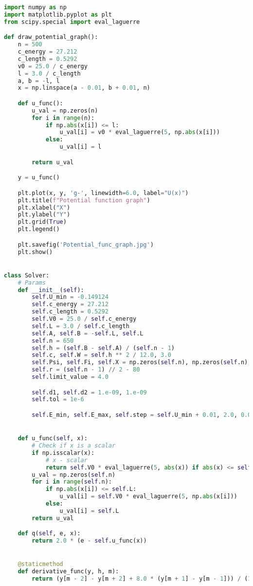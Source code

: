 \begin{lstlisting}[language=Python, caption=Код файла solver.py,label={lst:solver}]
import numpy as np
import matplotlib.pyplot as plt
from scipy.special import eval_laguerre

def draw_potential_graph():
    n = 500
    c_energy = 27.212
    c_length = 0.5292
    v0 = 25.0 / c_energy
    l = 3.0 / c_length
    a, b = -l, l
    x = np.linspace(a - 0.01, b + 0.01, n)

    def u_func():
        u_val = np.zeros(n)
        for i in range(n):
            if np.abs(x[i]) <= l:
                u_val[i] = v0 * eval_laguerre(5, np.abs(x[i]))
            else:
                u_val[i] = l

        return u_val

    y = u_func()

    plt.plot(x, y, 'g-', linewidth=6.0, label="U(x)")
    plt.title(f"Potential function graph")
    plt.xlabel("X")
    plt.ylabel("Y")
    plt.grid(True)
    plt.legend()

    plt.savefig('Potential_func_graph.jpg')
    plt.show()


class Solver:
    # Params
    def __init__(self):
        self.U_min = -0.149124
        self.c_energy = 27.212
        self.c_length = 0.5292
        self.V0 = 25.0 / self.c_energy
        self.L = 3.0 / self.c_length
        self.A, self.B = -self.L, self.L
        self.n = 650
        self.h = (self.B - self.A) / (self.n - 1)
        self.c, self.W = self.h ** 2 / 12.0, 3.0
        self.Psi, self.Fi, self.X = np.zeros(self.n), np.zeros(self.n), np.linspace(self.A, self.B, self.n)
        self.r = (self.n - 1) // 2 - 80
        self.limit_value = 4.0

        self.d1, self.d2 = 1.e-09, 1.e-09
        self.tol = 1e-6

        self.E_min, self.E_max, self.step = self.U_min + 0.01, 2.0, 0.01


    def u_func(self, x):
        # Check if x is a scalar
        if np.isscalar(x):
            # x - scalar
            return self.V0 * eval_laguerre(5, abs(x)) if abs(x) <= self.L else self.W
        u_val = np.zeros(self.n)
        for i in range(self.n):
            if np.abs(x[i]) <= self.L:
                u_val[i] = self.V0 * eval_laguerre(5, np.abs(x[i]))
            else:
                u_val[i] = self.L
        return u_val

    def q(self, e, x):
        return 2.0 * (e - self.u_func(x))


    @staticmethod
    def derivative_func(y, h, m):
        return (y[m - 2] - y[m + 2] + 8.0 * (y[m + 1] - y[m - 1])) / (12.0 * h)



\end{lstlisting}
